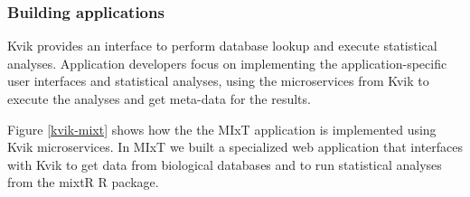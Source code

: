 
\subsubsection*{Building applications} 
Kvik provides an interface to perform database lookup and execute statistical
analyses. Application developers focus on implementing the
application-specific user interfaces and statistical analyses, using the
microservices from Kvik to execute the analyses and get meta-data for the
results. 

Figure \ref{kvik-mixt} shows how the the MIxT application is implemented using Kvik microservices. In MIxT we built a
specialized web application that interfaces with Kvik to get data from
biological databases and to run statistical analyses from the mixtR R package. 

